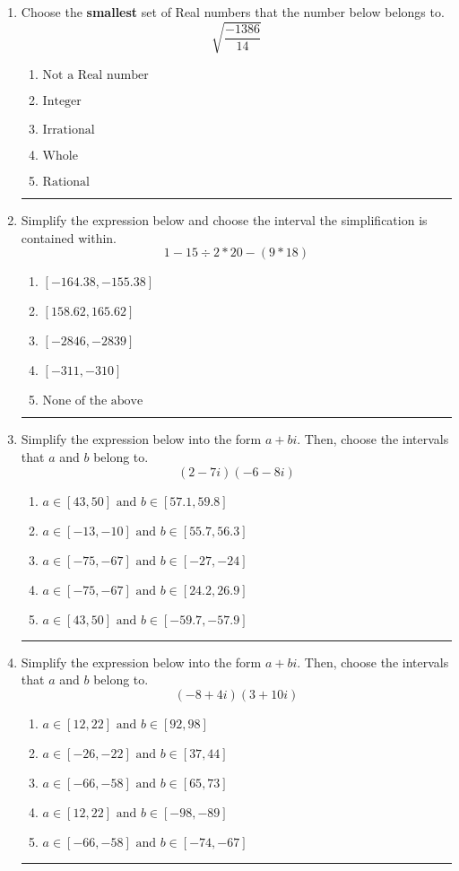\documentclass[14pt]{extbook}
\newcommand{\litem}[1]{\item#1\hspace*{-1cm}\rule{\textwidth}{0.4pt}}
\begin{document}
\begin{enumerate}
\litem{
Choose the \textbf{smallest} set of Real numbers that the number below belongs to.\[ \sqrt{\frac{-1386}{14}} \]\begin{enumerate}[label=\Alph*.]
\item \( \text{Not a Real number} \)
\item \( \text{Integer} \)
\item \( \text{Irrational} \)
\item \( \text{Whole} \)
\item \( \text{Rational} \)

\end{enumerate} }
\litem{
Simplify the expression below and choose the interval the simplification is contained within.\[ 1 - 15 \div 2 * 20 - (9 * 18) \]\begin{enumerate}[label=\Alph*.]
\item \( [-164.38, -155.38] \)
\item \( [158.62, 165.62] \)
\item \( [-2846, -2839] \)
\item \( [-311, -310] \)
\item \( \text{None of the above} \)

\end{enumerate} }
\litem{
Simplify the expression below into the form $a+bi$. Then, choose the intervals that $a$ and $b$ belong to.\[ (2 - 7 i)(-6 - 8 i) \]\begin{enumerate}[label=\Alph*.]
\item \( a \in [43, 50] \text{ and } b \in [57.1, 59.8] \)
\item \( a \in [-13, -10] \text{ and } b \in [55.7, 56.3] \)
\item \( a \in [-75, -67] \text{ and } b \in [-27, -24] \)
\item \( a \in [-75, -67] \text{ and } b \in [24.2, 26.9] \)
\item \( a \in [43, 50] \text{ and } b \in [-59.7, -57.9] \)

\end{enumerate} }
\litem{
Simplify the expression below into the form $a+bi$. Then, choose the intervals that $a$ and $b$ belong to.\[ (-8 + 4 i)(3 + 10 i) \]\begin{enumerate}[label=\Alph*.]
\item \( a \in [12, 22] \text{ and } b \in [92, 98] \)
\item \( a \in [-26, -22] \text{ and } b \in [37, 44] \)
\item \( a \in [-66, -58] \text{ and } b \in [65, 73] \)
\item \( a \in [12, 22] \text{ and } b \in [-98, -89] \)
\item \( a \in [-66, -58] \text{ and } b \in [-74, -67] \)


\end{enumerate}}
\end{enumerate}
\end{document}
